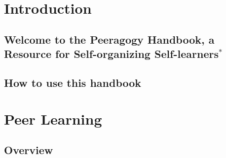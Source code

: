 \documentclass[ebook, 12pt, twoside]{memoir}
\begin{document}
\cleardoublepage

\frontmatter
\tableofcontents*

\mainmatter

\part{Introduction} %
\chapter[\textbf{Welcome!}]{Welcome to the Peeragogy Handbook, a Resource for Self-organizing Self-learners$^*$}
%

%
\chapter[\textbf{How to use this handbook}]{How to use this handbook}
%

%
\part{Peer Learning} %
%
\chapter[\textbf{Overview}]{Overview}

%
\end{document}
